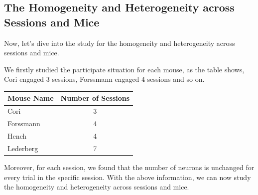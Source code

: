 \documentclass{article}
\begin{document}
	\subsection{The Homogeneity and Heterogeneity across Sessions and Mice}
	Now, let's dive into the study for the homogeneity and heterogeneity across sessions and mice. 
	\par We firstly studied the participate situation for each mouse, as the table shows, Cori engaged $3$ sessions, Forssmann engaged $4$ sessions and so on.
	\begin{table}[htbp]
		\centering
		\begin{tabular}{lc}
			\toprule
			\textbf{Mouse Name} & \textbf{Number of Sessions} \\
			\midrule
			Cori                & 3 \\
			Forssmann           & 4 \\
			Hench               & 4 \\
			Lederberg           & 7 \\
			\bottomrule
		\end{tabular}
	\end{table}
	\par Moreover, for each session, we found that the number of neurons is unchanged for every trial in the specific session. With the above information, we can now study the homogeneity and heterogeneity across sessions and mice.
\end{document}
